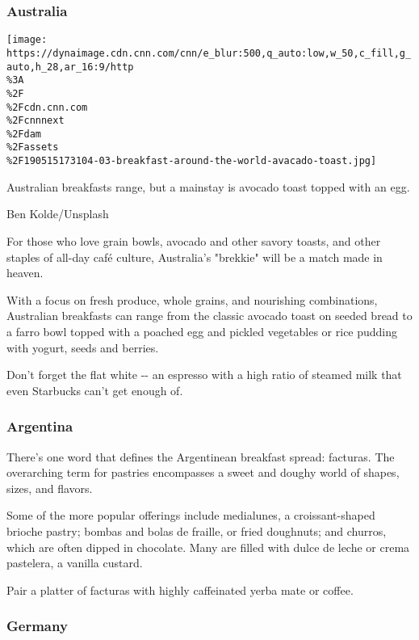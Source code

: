 \hypertarget{australia}{%
\subsubsection{Australia}\label{australia}}

\href{/travel/article/breakfast-food-around-the-world/index.html?gallery=6}{}

\texttt{[image: https://dynaimage.cdn.cnn.com/cnn/e\_blur:500,q\_auto:low,w\_50,c\_fill,g\_auto,h\_28,ar\_16:9/http\\\%3A\\\%2F\\\%2Fcdn.cnn.com\\\%2Fcnnnext\\\%2Fdam\\\%2Fassets\\\%2F190515173104-03-breakfast-around-the-world-avacado-toast.jpg]}

Australian breakfasts range, but a mainstay is avocado toast topped with
an egg.

Ben Kolde/Unsplash

For those who love grain bowls, avocado and other savory toasts, and
other staples of all-day café culture, Australia's "brekkie" will be a
match made in heaven.

With a focus on fresh produce, whole grains, and nourishing
combinations, Australian breakfasts can range from the classic avocado
toast on seeded bread to a farro bowl topped with a poached egg and
pickled vegetables or rice pudding with yogurt, seeds and berries.

Don't forget the flat white -\/- an espresso with a high ratio of
steamed milk that even Starbucks can't get enough of.

\hypertarget{argentina}{%
\subsubsection{Argentina}\label{argentina}}

There's one word that defines the Argentinean breakfast spread:
facturas. The overarching term for pastries encompasses a sweet and
doughy world of shapes, sizes, and flavors.

Some of the more popular offerings include medialunes, a
croissant-shaped brioche pastry; bombas and bolas de fraille, or fried
doughnuts; and churros, which are often dipped in chocolate. Many are
filled with dulce de leche or crema pastelera, a vanilla custard.

Pair a platter of facturas with highly caffeinated yerba mate or coffee.

\hypertarget{germany}{%
\subsubsection{Germany}\label{germany}}


